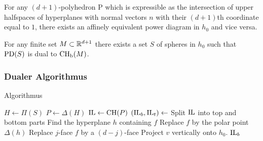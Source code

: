 \begin{frame}

    \begin{theorem}
        For any $(d+1)$-polyhedron P which is expressible as the intersection of upper halfspaces of hyperplanes with normal vectors $n$ with their $(d+1)$th coordinate equal to $1$, there exists an affinely equivalent power diagram in $h_0$ and vice versa.
    \end{theorem}
    \begin{theorem}
        For any finite set $M \subset \mathbb{R}^{d+1}$ there exists a set $S$ of spheres in $h_0$ such that $\operatorname{PD}(S)$ is dual to $\operatorname{CH_b}(M)$.
    \end{theorem}
\end{frame}

\begin{frame}
    \frametitle{Dualer Algorithmus}

    \begin{block}{Algorithmus}
        \begin{algorithmic}[1]
                \State $H \gets \Pi(S)$
                \State $P \gets \Delta(H)$
                \Statex
                \State $\operatorname{IL} \gets \operatorname{CH}(P)$
                \State $(\operatorname{IL}_b, \operatorname{IL}_t) \gets$ Split $\operatorname{IL}$ into top and bottom parts
                        \State Find the hyperplane $h$ containing $f$
                        \State Replace $f$ by the polar point $\Delta(h)$
                    \Else
                        \State Replace $j$-face $f$ by a $(d-j)$-face
                    \EndIf
                \EndFor
                \Statex
                    \State Project $v$ vertically onto $h_0$.
                \EndFor
                \State \Return $\operatorname{IL}_b$
            \EndFunction
        \end{algorithmic}
    \end{block}
\end{frame}

